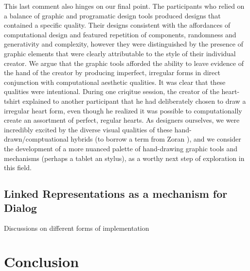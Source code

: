 \documentclass{sigchi}
\begin{document}
This last comment also hinges on our final point. The participants who relied on a balance of graphic and programatic design tools produced designs that contained a specific quality. Their designs consistent with the affordances of computational design and featured repetition of components, randomness and generativity and complexity, however they were distinguished by the presence of graphic elements that were clearly attributable to the style of their individual creator. We argue that the graphic tools afforded the ability to leave evidence of the hand of the creator by producing imperfect, irregular forms in direct conjunction with computational aesthetic qualities. It was clear that these qualities were intentional. During one criqitue session, the creator of the heart-tshirt explained to another participant that he had deliberately chosen to draw a irregular heart form, even though he realized it was possible to computationally create an assortment of perfect, regular hearts. As designers ourselves, we were incredibly excited by the diverse visual qualities of these hand-drawn/comptuational hybrids (to borrow a term from Zoran \cite{zoran_tochi}), and we consider the development of a more nuanced palette of hand-drawing graphic tools and mechanisms (perhaps a tablet an stylus), as a worthy next step of exploration in this field.

\subsection{Linked Representations as a mechanism for Dialog}
Discussions on different forms of implementation

\section{Conclusion}




\end{document}
